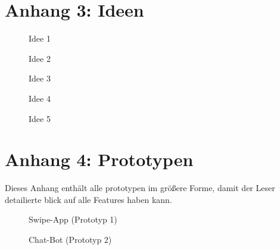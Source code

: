 \newpage

\section{Anhang 3: Ideen}
\label{anhang:ideen}

\begin{figure}[h!]
    \centering
    \caption{Idee 1}
    \label{fig:idea1}
\end{figure}

\begin{figure}[h!]
    \centering
    \caption{Idee 2}
    \label{fig:idea2}
\end{figure}

\begin{figure}[h!]
    \centering
    \caption{Idee 3}
    \label{fig:idea3}
\end{figure}

\begin{figure}[h!]
    \centering
    \caption{Idee 4}
    \label{fig:idea4}
\end{figure}


\begin{figure}[h!]
    \centering
    \caption{Idee 5}
    \label{fig:idea5}
\end{figure}

\vspace*{1in}

\newpage

\section{Anhang 4: Prototypen}
\label{anhang:protos}
Dieses Anhang enthält alle prototypen im größere Forme, damit der Leser detailierte blick auf alle Features haben kann.

\begin{figure}[ht]
    \centering
    \caption{Swipe-App (Prototyp 1)}
    \label{fig:prt1}
\end{figure}

\begin{figure}[ht]
    \centering
    \caption{Chat-Bot (Prototyp 2)}
    \label{fig:prt2}
\end{figure}

